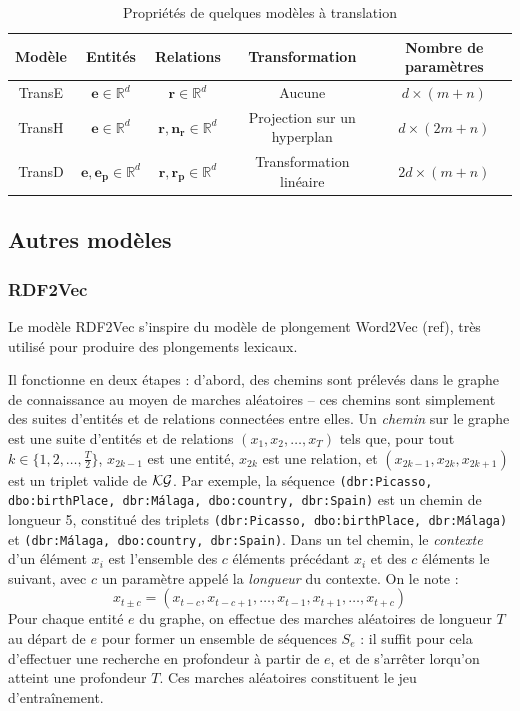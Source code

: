 \begin{table}[ht]
\caption{Propriétés de quelques modèles à translation}
\centering
\begin{tabular}{|c|c|c|c|c|}
\hline\rowcolor[gray]{0.8}\color{black}
Modèle & Entités & Relations & Transformation & Nombre de paramètres\\\hline
TransE & $\mathbf{e} \in \mathbb{R}^d$ & $\mathbf{r} \in \mathbb{R}^d$ & Aucune & $d \times (m + n)$ \\
TransH & $\mathbf{e} \in \mathbb{R}^d$ & $\mathbf{r, n_r} \in \mathbb{R}^d$ & Projection sur un hyperplan & $d \times (2m + n)$ \\
TransD & $\mathbf{e, e_p} \in \mathbb{R}^d$ & $\mathbf{r, r_p} \in \mathbb{R}^d$  & Transformation linéaire & $2d \times (m + n)$ \\\hline
\end{tabular}
\label{tab:transx}
\end{table}

\subsection{Autres modèles}
\label{subsec:kge-models-misc}

\subsubsection{RDF2Vec}

Le modèle RDF2Vec s'inspire du modèle de plongement Word2Vec (ref), très utilisé pour produire des plongements lexicaux.

Il fonctionne en deux étapes : d'abord, des chemins sont prélevés dans le graphe de connaissance au moyen de marches aléatoires – ces chemins sont simplement des suites d'entités et de relations connectées entre elles. %
Un \textit{chemin} sur le graphe est une suite d'entités et de relations $(x_1, x_2, \ldots, x_T)$ tels que, pour tout $k \in \{1, 2, \ldots, \frac{T}{2}\}$, $x_{2k-1}$ est une entité, $x_{2k}$ est une relation, et $(x_{2k-1}, x_{2k}, x_{2k+1})$ est un triplet valide de $\mathcal{KG}$. Par exemple, la séquence \texttt{(dbr:Picasso, dbo:birthPlace, dbr:Málaga, dbo:country, dbr:Spain)} est un chemin de longueur 5, constitué des triplets \texttt{(dbr:Picasso, dbo:birthPlace, dbr:Málaga)} et \texttt{(dbr:Málaga, \allowbreak dbo:country, dbr:Spain)}. 
Dans un tel chemin, le \textit{contexte} d'un élément $x_i$ est l'ensemble des $c$ éléments précédant $x_i$ et des $c$ éléments le suivant, avec $c$ un paramètre appelé la \textit{longueur}
du contexte. On le note :
 \begin{equation}
    x_{t \pm c} = (x_{t-c}, x_{t-c+1}, \ldots, x_{t-1}, x_{t+1}, \ldots, x_{t+c})
\end{equation}
 Pour chaque entité $e$ du graphe, on effectue des marches aléatoires de longueur $T$ au départ de $e$ pour former un ensemble de séquences $S_e$ : il suffit pour cela d'effectuer une recherche en profondeur à partir de $e$, et de s'arrêter lorqu'on atteint une profondeur $T$. Ces marches aléatoires constituent le jeu d'entraînement.


